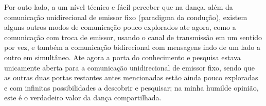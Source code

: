 \documentclass[a4paper,10pt]{article}
\begin{document}
Por outo lado, a um nível técnico e fácil perceber que na dança, além da comunicação 
unidirecional de emissor fixo  (paradigma da condução),
existem alguns outros modos de comunicação pouco explorados ate agora,
como a comunicação com troca de emissor, 
usando o canal de transmissão em um sentido por vez,
e também a comunicação bidirecional com mensagens indo de um lado a outro em simultâneo.
Ate agora a porta do conhecimento e pesquisa estava unicamente aberta para a 
comunicação unidirecional de emissor fixo, 
sendo que as outras duas portas restantes antes mencionadas estão ainda pouco 
exploradas e com infinitas possibilidades a descobrir e pesquisar; 
na minha humilde opinião, este é o verdadeiro valor da dança compartilhada. 


\medskip
 
\printbibliography
\end{document}
